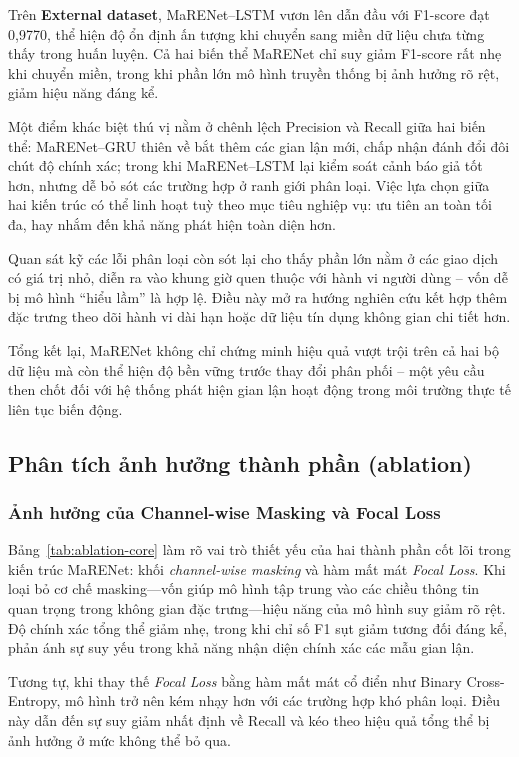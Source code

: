 Trên \textbf{External dataset}, MaRENet–LSTM vươn lên dẫn đầu với F1-score đạt 0{,}9770, thể hiện độ ổn định ấn tượng khi chuyển sang miền dữ liệu chưa từng thấy trong huấn luyện. Cả hai biến thể MaRENet chỉ suy giảm F1-score rất nhẹ khi chuyển miền, trong khi phần lớn mô hình truyền thống bị ảnh hưởng rõ rệt, giảm hiệu năng đáng kể.

Một điểm khác biệt thú vị nằm ở chênh lệch Precision và Recall giữa hai biến thể: MaRENet–GRU thiên về bắt thêm các gian lận mới, chấp nhận đánh đổi đôi chút độ chính xác; trong khi MaRENet–LSTM lại kiểm soát cảnh báo giả tốt hơn, nhưng dễ bỏ sót các trường hợp ở ranh giới phân loại. Việc lựa chọn giữa hai kiến trúc có thể linh hoạt tuỳ theo mục tiêu nghiệp vụ: ưu tiên an toàn tối đa, hay nhắm đến khả năng phát hiện toàn diện hơn.

Quan sát kỹ các lỗi phân loại còn sót lại cho thấy phần lớn nằm ở các giao dịch có giá trị nhỏ, diễn ra vào khung giờ quen thuộc với hành vi người dùng – vốn dễ bị mô hình “hiểu lầm” là hợp lệ. Điều này mở ra hướng nghiên cứu kết hợp thêm đặc trưng theo dõi hành vi dài hạn hoặc dữ liệu tín dụng không gian chi tiết hơn.

Tổng kết lại, MaRENet không chỉ chứng minh hiệu quả vượt trội trên cả hai bộ dữ liệu mà còn thể hiện độ bền vững trước thay đổi phân phối – một yêu cầu then chốt đối với hệ thống phát hiện gian lận hoạt động trong môi trường thực tế liên tục biến động.

\subsection{Phân tích ảnh hưởng thành phần (ablation)}
\label{subsec:ablation}

\subsubsection{Ảnh hưởng của Channel-wise Masking và Focal Loss}

Bảng~\ref{tab:ablation-core} làm rõ vai trò thiết yếu của hai thành phần cốt lõi trong kiến trúc MaRENet: khối \emph{channel-wise masking} và hàm mất mát \emph{Focal Loss}. Khi loại bỏ cơ chế masking—vốn giúp mô hình tập trung vào các chiều thông tin quan trọng trong không gian đặc trưng—hiệu năng của mô hình suy giảm rõ rệt. Độ chính xác tổng thể giảm nhẹ, trong khi chỉ số F1 sụt giảm tương đối đáng kể, phản ánh sự suy yếu trong khả năng nhận diện chính xác các mẫu gian lận.

Tương tự, khi thay thế \emph{Focal Loss} bằng hàm mất mát cổ điển như Binary Cross-Entropy, mô hình trở nên kém nhạy hơn với các trường hợp khó phân loại. Điều này dẫn đến sự suy giảm nhất định về Recall và kéo theo hiệu quả tổng thể bị ảnh hưởng ở mức không thể bỏ qua.

